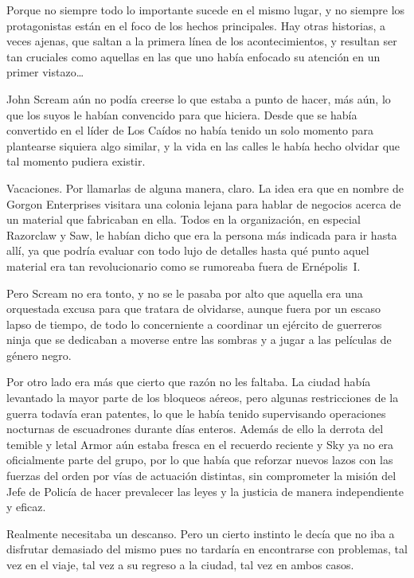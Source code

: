 \noindent
Porque no siempre todo lo importante sucede en el mismo lugar, y no siempre los protagonistas están en el foco de los hechos principales. Hay otras historias, a veces ajenas, que saltan a la primera línea de los acontecimientos, y resultan ser tan cruciales como aquellas en las que uno había enfocado su atención en un primer vistazo\dots

\parbreak\noindent
John Scream aún no podía creerse lo que estaba a punto de hacer, más aún, lo que los suyos le habían convencido para que hiciera. Desde que se había convertido en el líder de Los Caídos no había tenido un solo momento para plantearse siquiera algo similar, y la vida en las calles le había hecho olvidar que tal momento pudiera existir.

Vacaciones. Por llamarlas de alguna manera, claro. La idea era que en nombre de Gorgon Enterprises visitara una colonia lejana para hablar de negocios acerca de un material que fabricaban en ella. Todos en la organización, en especial Razorclaw y Saw, le habían dicho que era la persona más indicada para ir hasta allí, ya que podría evaluar con todo lujo de detalles hasta qué punto aquel material era tan revolucionario como se rumoreaba fuera de Ernépolis~I.

Pero Scream no era tonto, y no se le pasaba por alto que aquella era una orquestada excusa para que tratara de olvidarse, aunque fuera por un escaso lapso de tiempo, de todo lo concerniente a coordinar un ejército de guerreros ninja que se dedicaban a moverse entre las sombras y a jugar a las películas de género negro.

Por otro lado era más que cierto que razón no les faltaba. La ciudad había levantado la mayor parte de los bloqueos aéreos, pero algunas restricciones de la guerra todavía eran patentes, lo que le había tenido supervisando operaciones nocturnas de escuadrones durante días enteros. Además de ello la derrota del temible y letal Armor aún estaba fresca en el recuerdo reciente y Sky ya no era oficialmente parte del grupo, por lo que había que reforzar nuevos lazos con las fuerzas del orden por vías de actuación distintas, sin comprometer la misión del Jefe de Policía de hacer prevalecer las leyes y la justicia de manera independiente y eficaz.

Realmente necesitaba un descanso. Pero un cierto instinto le decía que no iba a disfrutar demasiado del mismo pues no tardaría en encontrarse con problemas, tal vez en el viaje, tal vez a su regreso a la ciudad, tal vez en ambos casos.

